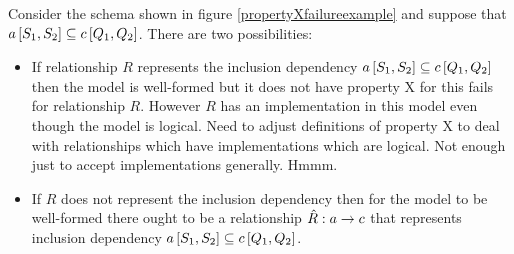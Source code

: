 Consider the schema shown in figure \ref{propertyXfailureexample} and suppose that $a\left[S_1,S_2\right]\subseteq c\left[Q_1,Q_2\right]$. 
There are two possibilities:
\begin{itemize}
\item 
If relationship $R$ represents the inclusion dependency
$a\left[S_1,S_2\right]\subseteq c\left[Q_1,Q_2\right]$ then the model is well-formed but it does not have property X for this fails for relationship 
$R$. However $R$ has an implementation in this model even though the model is logical. Need to adjust definitions of property X
to deal with relationships which have implementations which are logical. Not enough just to accept implementations generally. Hmmm. 
\item
If $R$ does not represent the inclusion dependency then for the model to be well-formed there ought to be a relationship
$\hat{R}:a \rightarrow c$ that represents inclusion dependency $a\left[S_1,S_2\right]\subseteq c\left[Q_1,Q_2\right]$. \\


\end{itemize}
